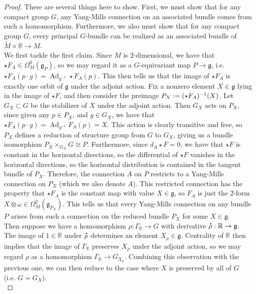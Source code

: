 \documentclass[psamsfonts, 12pt]{amsart}
\theoremstyle{definition}
\theoremstyle{remark}
\newcommand{\R}{\mathbb{R}}
\newcommand{\g}{\mathfrak{g}}
\newcommand*{\dt}[1]{%
   \accentset{\mbox{\large\bfseries .}}{#1}}
\newcommand{\inv}{^{-1}}
\newcommand{\defeq}{\vcentcolon=}
\DeclareMathOperator{\Ad}{Ad}
\begin{document}
\begin{proof}
There are several things here to show. First, we must show that for any compact
group $G$, any Yang-Mills connection on an associated bundle comes from such a
homomorphism. Furthermore, we also must show that for any compact
group $G$, every principal $G$-bundle can be realized as an associated bundle
of $\widetilde{M} \times \R \to M$. \\

We first tackle the first claim. Since $M$ is $2$-dimensional, we have that
$\star F_A \in \Omega^0_M(\g_P)$, so we may regard it as a $G$-equivariant map
$P \to \g$, i.e. $\star F_A(p\cdot g) = \Ad_{g\inv}\star F_A(p)$. This then
tells us that the image of $\star F_A$ is exactly one orbit of $\g$ under the adjoint
action.  Fix a nonzero element $X \in \g$ lying in the image of $\star F$, and then
consider the preimage $P_X \defeq (\star F_A)\inv(X)$. Let $G_X \subset G$ be the
stabilizer of $X$ under the adjoint action. Then $G_X$ acts on $P_X$, since given any
$p \in P_X$, and $g \in G_X$, we have that $\star F_A(p\cdot g) = \Ad_{g\inv} F_A(p) = X$.
This action is clearly transitive and free, so $P_X$ defines a reduction of structure
group from $G$ to $G_X$, giving us a bundle isomorphism $P_X \times_{G_X} G \cong P$.
Furthermore, since $d_A \star F = 0$, we have that $\star F$ is constant in
the horizontal directions, so the differential of $\star F$ vanishes in the horizontal
directions, so the horizontal distribution is contained in the tangent bundle
of $P_X$. Therefore, the connection $A$ on $P$ restricts to a Yang-Mills connection on
$P_X$ (which we also denote $A$). This restricted connection has the property
that $\star F_A$ is the constant map with value $X \in \g$, so $F_A$ is
just the $2$-form $X \otimes \omega \in \Omega^2_M(\g_{P_X})$. This tells us that
every Yang-Mills connection on any bundle $P$ arises from such a connection on
the reduced bundle $P_X$ for some $X \in \g$. \\

Then suppose we have a homomorphism $\rho : \Gamma_\R \to G$ with derivative
$\dt{\rho} : \R \to \g$. The image of $1 \in \R$ under $\dt{\rho}$ determines an
element $X_\rho \in \g$. Centrality of $\R$ then implies that
the image of $\Gamma_\R$ preserves $X_\rho$ under the adjoint action, so we may
regard $\rho$ as a homomorphism $\Gamma_\R \to G_{X_\rho}$. Combining this observation
with the previous one, we can then reduce to the case where $X$ is preserved
by all of $G$ (i.e. $G = G_X$). \\


\end{proof}
\end{document}
